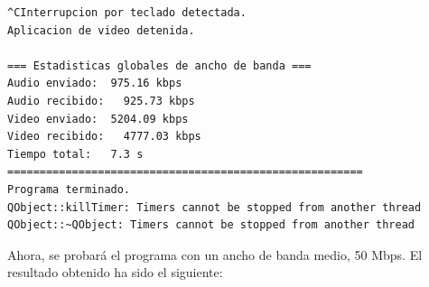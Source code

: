 \begin{adjustbox}{max width=\textwidth}
\begin{lstlisting}[language=bash,basicstyle=\ttfamily\scriptsize]
^CInterrupcion por teclado detectada.
Aplicacion de video detenida.

=== Estadisticas globales de ancho de banda ===
Audio enviado:	975.16 kbps
Audio recibido:   925.73 kbps
Video enviado:	5204.09 kbps
Video recibido:   4777.03 kbps
Tiempo total: 	7.3 s
=======================================================
Programa terminado.
QObject::killTimer: Timers cannot be stopped from another thread
QObject::~QObject: Timers cannot be stopped from another thread
\end{lstlisting}
\end{adjustbox}
\vspace{\baselineskip}

\newpage

Ahora, se probará el programa con un ancho de banda medio, 50 Mbps. El resultado obtenido ha sido el siguiente:
\vspace{\baselineskip}

